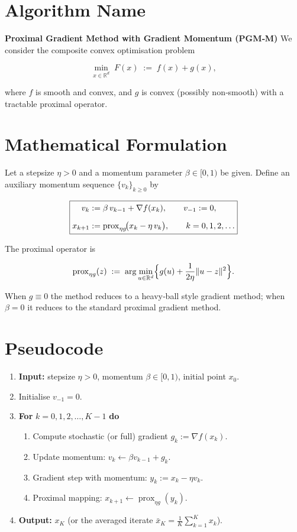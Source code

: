 \documentclass{article}
\newcommand{\prox}{\operatorname{prox}}
\begin{document}
\section*{Algorithm Name}
\textbf{Proximal Gradient Method with Gradient Momentum (PGM‑M)}  
We consider the composite convex optimisation problem  

\[
\min_{x\in\mathbb{R}^{d}} \; F(x)\;:=\;f(x)+g(x),
\]

where \(f\) is smooth and convex, and \(g\) is convex (possibly non‑smooth) with a tractable proximal operator.

\section*{Mathematical Formulation}
Let a stepsize \(\eta>0\) and a momentum parameter \(\beta\in[0,1)\) be given.
Define an auxiliary momentum sequence \(\{v_k\}_{k\ge 0}\) by  

\[
\boxed{%
\begin{aligned}
v_k &:= \beta\,v_{k-1}+ \nabla f(x_k), \qquad v_{-1}:=0,\\[2mm]
x_{k+1} &:= \prox_{\eta g}\!\bigl(x_k-\eta\,v_k\bigr), \qquad k=0,1,2,\dots
\end{aligned}}
\]

The proximal operator is  

\[
\prox_{\eta g}(z)\;:=\;\arg\min_{u\in\mathbb{R}^{d}}\Bigl\{ g(u)+\frac{1}{2\eta}\|u-z\|^{2}\Bigr\}.
\]

When \(g\equiv0\) the method reduces to a heavy‑ball style gradient method; when \(\beta=0\) it reduces to the standard proximal gradient method.

\section*{Pseudocode}
\begin{enumerate}[leftmargin=*, label=\textbf{Step \arabic*:}]
\item \textbf{Input:} stepsize \(\eta>0\), momentum \(\beta\in[0,1)\), initial point \(x_{0}\).
\item Initialise \(v_{-1}=0\).
\item \textbf{For} \(k=0,1,2,\dots,K-1\) \textbf{do}
\begin{enumerate}[label=\roman*.]
\item Compute stochastic (or full) gradient \(g_k:=\nabla f(x_k)\).
\item Update momentum: \(v_k\gets \beta v_{k-1}+g_k\).
\item Gradient step with momentum: \(y_k:=x_k-\eta v_k\).
\item Proximal mapping: \(x_{k+1}\gets \prox_{\eta g}(y_k)\).
\end{enumerate}
\item \textbf{Output:} \(x_{K}\) (or the averaged iterate \(\bar{x}_K=\tfrac1K\sum_{k=1}^{K}x_k\)).
\end{enumerate}
\end{document}
